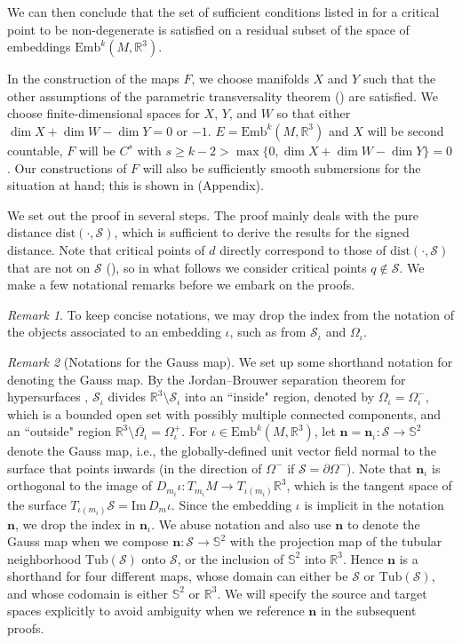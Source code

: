 \documentclass[11pt]{article}
\newcommand{\R}{\mathbb{R}}
\newcommand{\Sbb}{\mathbb{S}}
\newcommand{\io}{\iota}
\newcommand{\nbf}{\mathbf{n}}
\newcommand{\W}{\Omega}
\newcommand{\bord}{\partial}
\newcommand{\Emb}{\mathrm{Emb}^k(M,\R^3)}
\newcommand{\dist}{\mathrm{dist}}
\newcommand{\Surf}{\mathcal{S}}
\renewcommand{\Im}{\mathrm{Im} \,}
\theoremstyle{plain}
\theoremstyle{definition}
\theoremstyle{remark}
\newtheorem{rmk}{Remark}
\begin{document}
	We can then conclude that the set of sufficient conditions listed in  for a critical point to be non-degenerate is satisfied on a residual subset of the space of embeddings $\Emb$.
	
	In the construction of the maps $F$, we choose manifolds $X$ and $Y$ such that the other assumptions of the parametric transversality theorem () are satisfied. We choose finite-dimensional spaces for $X$, $Y$, and $W$ so that either $\dim X + \dim W - \dim Y = 0$ or $-1$. $E = \Emb$ and $X$ will be second countable, $F$ will be $C^{s}$ with $s \geq k - 2 > \max \{ 0, \dim X + \dim W - \dim Y \} = 0$. Our constructions of $F$ will also  be sufficiently smooth submersions for the situation at hand; this is shown in  (Appendix).
	
	We set out the proof in several steps. The proof mainly deals with the pure distance $\dist(\cdot, \Surf)$, which is sufficient to derive the results for the signed distance. Note that critical points of $d$ directly correspond to those of $\dist(\cdot, \Surf)$ that are not on $\Surf$ (), so in what follows we consider critical points $q \notin \Surf$. 
	We make a few notational remarks before we embark on the proofs.
	
	\begin{rmk}
		To keep concise notations, we may drop the index from the notation of the objects associated to an embedding $\iota$, such as from $\Surf_\iota$ and $\W_\iota$.
	\end{rmk}
	
	\begin{rmk}[Notations for the Gauss map]
		\label{rmk:gauss_map_notation}
		We set up some shorthand notation for denoting the Gauss map. By the Jordan--Brouwer separation theorem for hypersurfaces \citep{lima_jordan-brouwer_1988,mcgrath_smooth_2016}, $\Surf_\iota$ divides $\R^3 \setminus \Surf_\iota$ into an ``inside" region, denoted by $\W_\iota = \W_\iota^-$, which is a bounded open set with possibly multiple connected components, and an ``outside" region $\R^3 \setminus \overline{\W_\iota} = \W_\iota^+$. For $\io \in \Emb$, let $\nbf = \nbf_\io : \Surf \to \mathbb{S}^2$ denote the Gauss map, i.e., the globally-defined unit vector field normal to the surface that points inwards (in the direction of $\W^-$ if $\Surf = \bord \W^-$). Note that $\nbf_\io$ is orthogonal to the image of $D_{m_i} \io : T_{m_i} M \to T_{\iota(m_i)}\R^3$, which is the tangent space of the surface $T_{\iota(m_i)} \Surf = \Im D_m\io$. Since the embedding $\iota$ is implicit in the notation $\nbf$, we drop the index in $\nbf_\io$.
		We abuse notation and also use $\nbf$ to denote the Gauss map when we compose $\nbf:\Surf \to \mathbb{S}^2$ with the projection map of the tubular neighborhood $\mathrm{Tub}(\Surf)$ onto $\Surf$, or the inclusion of $\Sbb^2$ into $\R^3$. Hence $\nbf$ is a shorthand for four different maps, whose domain can either be $\Surf$ or $\mathrm{Tub}(\Surf)$, and whose codomain is either $\mathbb{S}^2$ or $\R^3$. We will specify the source and target spaces explicitly to avoid ambiguity when we reference $\nbf$ in the subsequent proofs.
	\end{rmk}
	
\end{document}
